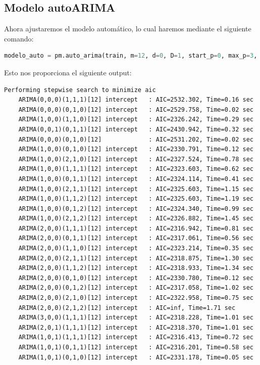 \documentclass[a4paper,onecolumn]{extarticle}
\begin{document}
\begin{sloppypar}
\subsection{Modelo autoARIMA}\label{autoARIMA}
Ahora ajustaremos el modelo automático, lo cual haremos mediante el siguiente comando:
\begin{lstlisting}[language=Python]
    modelo_auto = pm.auto_arima(train, m=12, d=0, D=1, start_p=0, max_p=3, start_q=0, max_q=3,seasonal=True, trace=True,error_action='ignore', suppress_warnings=True,stepwise=True) 
\end{lstlisting}
Esto nos proporciona el siguiente output:
\begin{lstlisting}[numbers=none]
    Performing stepwise search to minimize aic
    ARIMA(0,0,0)(1,1,1)[12] intercept   : AIC=2532.302, Time=0.16 sec
    ARIMA(0,0,0)(0,1,0)[12] intercept   : AIC=2529.758, Time=0.02 sec
    ARIMA(1,0,0)(1,1,0)[12] intercept   : AIC=2326.242, Time=0.29 sec
    ARIMA(0,0,1)(0,1,1)[12] intercept   : AIC=2430.942, Time=0.32 sec
    ARIMA(0,0,0)(0,1,0)[12]             : AIC=2531.202, Time=0.02 sec
    ARIMA(1,0,0)(0,1,0)[12] intercept   : AIC=2330.791, Time=0.12 sec
    ARIMA(1,0,0)(2,1,0)[12] intercept   : AIC=2327.524, Time=0.78 sec
    ARIMA(1,0,0)(1,1,1)[12] intercept   : AIC=2323.603, Time=0.62 sec
    ARIMA(1,0,0)(0,1,1)[12] intercept   : AIC=2324.114, Time=0.41 sec
    ARIMA(1,0,0)(2,1,1)[12] intercept   : AIC=2325.603, Time=1.15 sec
    ARIMA(1,0,0)(1,1,2)[12] intercept   : AIC=2325.603, Time=1.19 sec
    ARIMA(1,0,0)(0,1,2)[12] intercept   : AIC=2324.340, Time=0.99 sec
    ARIMA(1,0,0)(2,1,2)[12] intercept   : AIC=2326.882, Time=1.45 sec
    ARIMA(2,0,0)(1,1,1)[12] intercept   : AIC=2316.942, Time=0.81 sec
    ARIMA(2,0,0)(0,1,1)[12] intercept   : AIC=2317.061, Time=0.56 sec
    ARIMA(2,0,0)(1,1,0)[12] intercept   : AIC=2323.214, Time=0.35 sec
    ARIMA(2,0,0)(2,1,1)[12] intercept   : AIC=2318.875, Time=1.30 sec
    ARIMA(2,0,0)(1,1,2)[12] intercept   : AIC=2318.933, Time=1.34 sec
    ARIMA(2,0,0)(0,1,0)[12] intercept   : AIC=2330.780, Time=0.12 sec
    ARIMA(2,0,0)(0,1,2)[12] intercept   : AIC=2317.058, Time=1.02 sec
    ARIMA(2,0,0)(2,1,0)[12] intercept   : AIC=2322.958, Time=0.75 sec
    ARIMA(2,0,0)(2,1,2)[12] intercept   : AIC=inf, Time=1.71 sec
    ARIMA(3,0,0)(1,1,1)[12] intercept   : AIC=2318.228, Time=1.01 sec
    ARIMA(2,0,1)(1,1,1)[12] intercept   : AIC=2318.370, Time=1.01 sec
    ARIMA(1,0,1)(1,1,1)[12] intercept   : AIC=2316.413, Time=0.72 sec
    ARIMA(1,0,1)(0,1,1)[12] intercept   : AIC=2316.201, Time=0.58 sec
    ARIMA(1,0,1)(0,1,0)[12] intercept   : AIC=2331.178, Time=0.05 sec

\end{lstlisting}
\end{sloppypar}
\end{document}
